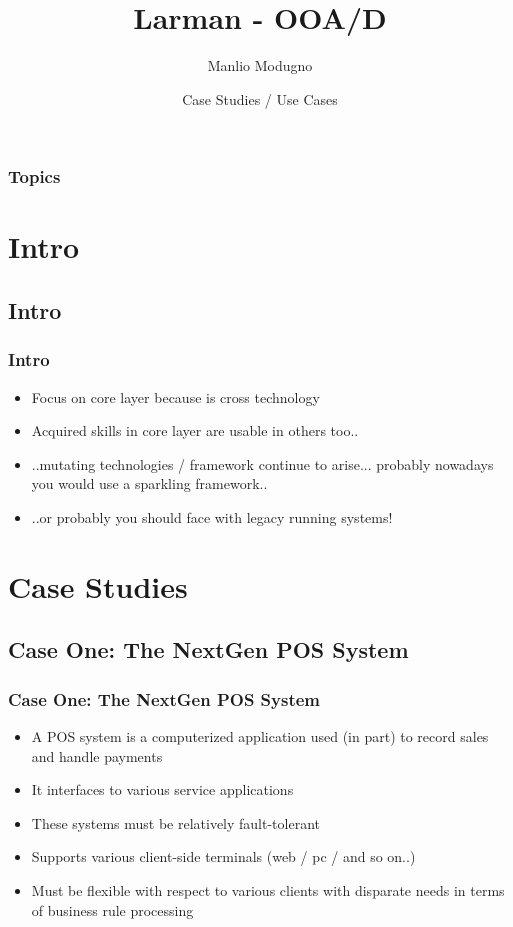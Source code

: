 \documentclass{beamer}
\title{Larman - OOA/D}
\author{Manlio Modugno}
\institute[GMTechnologies]
\date[]{Case Studies / Use Cases}
\begin{document}
\begin{frame}
  \titlepage
\end{frame}

\begin{frame}
  \frametitle{Topics}
  \tableofcontents
\end{frame}


\section{Intro}
\subsection{Intro}
\begin{frame}
  \frametitle{Intro}
  \begin{itemize}
	\item<+-> Focus on core layer because is cross technology 
	\item<+-> Acquired skills in core layer are usable in others too..
	\item<+-> ..mutating technologies / framework continue to arise... probably nowadays you would use a sparkling framework..
	\item<+-> ..or probably you should face with legacy running systems! 
   \end{itemize}
\end{frame}

\section{Case Studies}
\subsection{Case One: The NextGen POS System}
\begin{frame}
  \frametitle{Case One: The NextGen POS System}
  \begin{itemize}
	\item<+-> A POS system is a computerized application used (in part) to record sales and handle payments
	\item<+-> It interfaces to various service applications
	\item<+-> These systems must be relatively fault-tolerant
	\item<+-> Supports various client-side terminals (web / pc / and so on..) 
	\item<+-> Must be flexible with respect to various clients with disparate needs in terms of business rule processing
   \end{itemize}
\end{frame}
\end{document}
